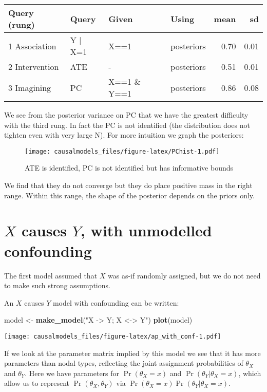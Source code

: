 \documentclass[
  12pt,
]{book}
\newenvironment{Shaded}{\begin{snugshade}}{\end{snugshade}}
\newcommand{\KeywordTok}[1]{\textcolor[rgb]{0.13,0.29,0.53}{\textbf{#1}}}
\newcommand{\NormalTok}[1]{#1}
\newcommand{\StringTok}[1]{\textcolor[rgb]{0.31,0.60,0.02}{#1}}
\begin{document}
\begin{tabular}{l|l|l|l|r|r}
\hline
Query (rung) & Query & Given & Using & mean & sd\\
\hline
1 Association & Y | X=1 & X==1 & posteriors & 0.70 & 0.01\\
\hline
2 Intervention & ATE & - & posteriors & 0.51 & 0.01\\
\hline
3 Imagining & PC & X==1 \& Y==1 & posteriors & 0.86 & 0.08\\
\hline
\end{tabular}

We see from the posterior variance on PC that we have the greatest difficulty with the third rung. In fact the PC is not identified (the distribution does not tighten even with very large N). For more intuition we graph the posteriors:

\begin{figure}
\centering
\texttt{[image: causalmodels\_files/figure-latex/PChist-1.pdf]}
\caption{\label{fig:PChist}ATE is identified, PC is not identified but has informative bounds}
\end{figure}

We find that they do not converge but they do place positive mass in the right range. Within this range, the shape of the posterior depends on the priors only.

\hypertarget{x-causes-y-with-unmodelled-confounding}{%
\section{\texorpdfstring{\(X\) causes \(Y\), with unmodelled confounding}{X causes Y, with unmodelled confounding}}\label{x-causes-y-with-unmodelled-confounding}}

The first model assumed that \(X\) was as-if randomly assigned, but we do not need to make such strong assumptions.

An \(X\) causes \(Y\) model with confounding can be written:

\begin{Shaded}
\begin{Highlighting}[]
\NormalTok{model <-}\StringTok{ }\KeywordTok{make_model}\NormalTok{(}\StringTok{"X -> Y; X <-> Y"}\NormalTok{) }
\KeywordTok{plot}\NormalTok{(model)}
\end{Highlighting}
\end{Shaded}

\texttt{[image: causalmodels\_files/figure-latex/ap\_with\_conf-1.pdf]}

If we look at the parameter matrix implied by this model we see that it has more parameters than nodal types, reflecting the joint assignment probabilities of \(\theta_X\) and \(\theta_Y\). Here we have parameters for \(\Pr(\theta_X=x)\) and \(\Pr(\theta_Y |\theta_X=x)\), which allow us to represent \(\Pr(\theta_X, \theta_Y)\) via \(\Pr(\theta_X=x)\Pr(\theta_Y |\theta_X=x)\).
\end{document}
